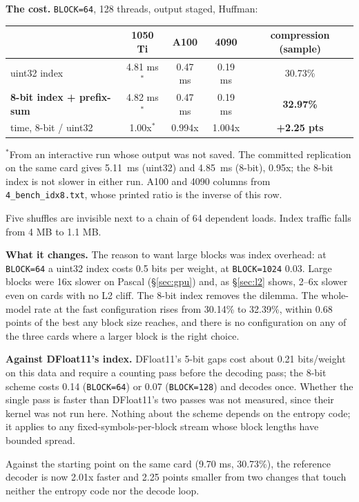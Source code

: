 \documentclass[11pt,a4paper]{article}
\newcommand{\code}[1]{\texttt{#1}}
\newcommand{\B}[1]{\textbf{#1}}
\begin{document}
\B{The cost.} \code{BLOCK=64}, 128 threads, output staged, Huffman:

\begin{center}
\begin{tabular}{@{}lcccc@{}}
\toprule
 & 1050 Ti & A100 & 4090 & compression (sample) \\
\midrule
uint32 index & 4.81 ms$^*$ & 0.47 ms & 0.19 ms & 30.73\% \\
\B{8-bit index + prefix-sum} & 4.82 ms$^*$ & 0.47 ms & 0.19 ms & \B{32.97\%} \\
time, 8-bit / uint32 & 1.00x$^*$ & 0.994x & 1.004x & \B{+2.25 pts} \\
\bottomrule
\end{tabular}
\end{center}

{\small $^*$From an interactive run whose output was not saved. The committed replication on the same card gives 5.11~ms (uint32) and 4.85~ms (8-bit), 0.95x; the 8-bit index is not slower in either run. A100 and 4090 columns from \code{4\_bench\_idx8.txt}, whose printed ratio is the inverse of this row.}

Five shuffles are invisible next to a chain of 64 dependent loads. Index traffic falls from 4 MB to 1.1 MB.

\B{What it changes.} The reason to want large blocks was index overhead: at \code{BLOCK=64} a uint32 index costs 0.5 bits per weight, at \code{BLOCK=1024} 0.03. Large blocks were 16x slower on Pascal (\S\ref{sec:gpu}) and, as \S\ref{sec:l2} shows, 2--6x slower even on cards with no L2 cliff. The 8-bit index removes the dilemma. The whole-model rate at the fast configuration rises from 30.14\% to 32.39\%, within 0.68 points of the best any block size reaches, and there is no configuration on any of the three cards where a larger block is the right choice.

\B{Against DFloat11's index.} DFloat11's 5-bit gaps cost about 0.21 bits/weight on this data and require a counting pass before the decoding pass; the 8-bit scheme costs 0.14 (\code{BLOCK=64}) or 0.07 (\code{BLOCK=128}) and decodes once. Whether the single pass is faster than DFloat11's two passes was not measured, since their kernel was not run here. Nothing about the scheme depends on the entropy code; it applies to any fixed-symbols-per-block stream whose block lengths have bounded spread.

Against the starting point on the same card (9.70 ms, 30.73\%), the reference decoder is now 2.01x faster and 2.25 points smaller from two changes that touch neither the entropy code nor the decode loop.
\end{document}
